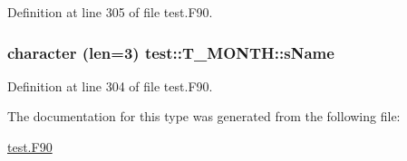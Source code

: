 Definition at line 305 of file test.F90.

\hypertarget{typetest_1_1_t___m_o_n_t_h_a90e4d6c7a2daec91a7923b51a500983b}{
\subsubsection[{sName}]{\setlength{\rightskip}{0pt plus 5cm}character (len=3) {\bf test::T\_\-MONTH::sName}}}
\label{typetest_1_1_t___m_o_n_t_h_a90e4d6c7a2daec91a7923b51a500983b}


Definition at line 304 of file test.F90.



The documentation for this type was generated from the following file:\begin{DoxyCompactItemize}
\item 
\hyperlink{test_8_f90}{test.F90}\end{DoxyCompactItemize}

